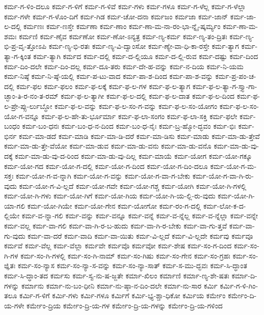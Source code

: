 {ಕರ್ಮ-ಗ-ಳಿಂ-ದಲೂ
ಕರ್ಮ-ಗ-ಳಿಗೆ
ಕರ್ಮ-ಗ-ಳಿವೆ
ಕರ್ಮ-ಗಳು
ಕರ್ಮ-ಗಳೂ
ಕರ್ಮ-ಗ-ಳೆಲ್ಲ
ಕರ್ಮ-ಗ-ಳೆಲ್ಲಾ
ಕರ್ಮ-ಗಳೇ
ಕರ್ಮ-ಗ-ಳೊಂ-ದಿಗೆ
ಕರ್ಮ-ಗಿಡ
ಕರ್ಮ-ಚೋ-ದನಾ
ಕರ್ಮಜಂ
ಕರ್ಮಜಾ
ಕರ್ಮ-ಜಾನ್
ಕರ್ಮ-ಜಾ-ಲ-ದಲ್ಲಿ
ಕರ್ಮಣಃ
ಕರ್ಮ-ಣಸ್ತೇ
ಕರ್ಮಣಾ
ಕರ್ಮ-ಣಾಂ
ಕರ್ಮ-ಣಾ-ಮ-ನಾ-ರಂ-ಭಾ-ನ್ನೈ-ಷ್ಕರ್ಮ್ಯಂ
ಕರ್ಮ-ಣಾ-ಮ-ಶಮಃ
ಕರ್ಮಣಿ
ಕರ್ಮ-ಣೈವ
ಕರ್ಮಣೋ
ಕರ್ಮ-ಣೋ-ಽನ್ಯತ್ರ
ಕರ್ಮ-ಣ್ಯ-ಕರ್ಮ
ಕರ್ಮ-ಣ್ಯ-ತಂ-ದ್ರಿತಃ
ಕರ್ಮ-ಣ್ಯ-ಭಿ-ಪ್ರ-ವೃ-ತ್ತೋಽಪಿ
ಕರ್ಮ-ಣ್ಯ-ಭಿ-ರತಃ
ಕರ್ಮ-ಣ್ಯ-ವಿ-ದ್ವಾಂಸೋ
ಕರ್ಮ-ಣ್ಯೇ-ವಾ-ಧಿ-ಕಾ-ರಸ್ತೇ
ಕರ್ಮ-ತ್ಯಾಗ
ಕರ್ಮ-ತ್ಯಾ-ಗ-ಕ್ಕಿಂತ
ಕರ್ಮ-ತ್ಯಾಗಿ
ಕರ್ಮದ
ಕರ್ಮ-ದಲ್ಲಿ
ಕರ್ಮ-ದ-ಲ್ಲಿಯೂ
ಕರ್ಮ-ದ-ಲ್ಲಿ-ರುವ
ಕರ್ಮ-ದಷ್ಟು
ಕರ್ಮ-ದಿಂದ
ಕರ್ಮ-ದಿಂ-ದಲೇ
ಕರ್ಮ-ದಿಂ-ದಲ್ಲ
ಕರ್ಮ-ದೂ-ತರು
ಕರ್ಮ-ದೇ-ಹ-ವನ್ನು
ಕರ್ಮ-ನ-ದಿಯ
ಕರ್ಮ-ನಿ-ಯಮ
ಕರ್ಮ-ನಿಷ್ಠೆ
ಕರ್ಮ-ನಿ-ಷ್ಠೆ-ಯಲ್ಲಿ
ಕರ್ಮ-ಪ-ಟು-ವಾದ
ಕರ್ಮ-ಪಾ-ಶ-ದಿಂದ
ಕರ್ಮ-ಪಾ-ಶ-ವನ್ನು
ಕರ್ಮ-ಪ್ರ-ಪಂ-ಚ-ದಲ್ಲಿ
ಕರ್ಮ-ಫಲ
ಕರ್ಮ-ಫಲಂ
ಕರ್ಮ-ಫ-ಲಕ್ಕೆ
ಕರ್ಮ-ಫ-ಲ-ಗಳ
ಕರ್ಮ-ಫ-ಲ-ತ್ಯಾಗ
ಕರ್ಮ-ಫ-ಲ-ತ್ಯಾ-ಗ-ಸ್ತ್ಯಾ-ಗಾ-ಚ್ಛಾಂ-ತಿ-ರ-ನಂ-ತ-ರಮ್
ಕರ್ಮ-ಫ-ಲ-ತ್ಯಾಗೀ
ಕರ್ಮ-ಫ-ಲ-ದಲ್ಲಿ
ಕರ್ಮ-ಫ-ಲ-ದಾತ
ಕರ್ಮ-ಫ-ಲ-ದಿಂದ
ಕರ್ಮ-ಫ-ಲ-ಪ್ರೇ-ಪ್ಸು-ರ್ಲುಬ್ಧೋ
ಕರ್ಮ-ಫ-ಲ-ವನ್ನು
ಕರ್ಮ-ಫ-ಲ-ಸಂ-ಗ-ವನ್ನು
ಕರ್ಮ-ಫ-ಲ-ಸಂ-ಯೋಗಂ
ಕರ್ಮ-ಫ-ಲ-ಸಂ-ಯೋ-ಗ-ವನ್ನೂ
ಕರ್ಮ-ಫ-ಲ-ಹೇ-ತು-ರ್ಭೂರ್ಮಾ
ಕರ್ಮ-ಫ-ಲಾ-ಸಂಗಂ
ಕರ್ಮ-ಫ-ಲಾ-ಸಕ್ತಿ
ಕರ್ಮ-ಫಲೇ
ಕರ್ಮ-ಬಂಧಂ
ಕರ್ಮ-ಬಂ-ಧನಃ
ಕರ್ಮ-ಬಂ-ಧ-ನ-ದಿಂದ
ಕರ್ಮ-ಬಂ-ಧ-ನೈಃ
ಕರ್ಮ-ಬ್ರ-ಹ್ಮೋ-ದ್ಭವಂ
ಕರ್ಮ-ಭಿಃ
ಕರ್ಮ-ಭಿರ್ನ
ಕರ್ಮ-ಮಾ-ಡದೆ
ಕರ್ಮ-ಮಾಡಿ
ಕರ್ಮ-ಮಾ-ಡಿ-ದರೆ
ಕರ್ಮ-ಮಾ-ಡಿಸು
ಕರ್ಮ-ಮಾಡು
ಕರ್ಮ-ಮಾ-ಡು-ತ್ತೇವೆ
ಕರ್ಮ-ಮಾ-ಡು-ತ್ತೇ-ವೆಯೋ
ಕರ್ಮ-ಮಾ-ಡುವ
ಕರ್ಮ-ಮಾ-ಡು-ವನು
ಕರ್ಮ-ಮಾ-ಡು-ವನೊ
ಕರ್ಮ-ಮಾ-ಡು-ವು-ದಕ್ಕೆ
ಕರ್ಮ-ಮಾ-ಡು-ವು-ದ-ರಿಂದ
ಕರ್ಮ-ಮಾ-ಡು-ವು-ದಿಲ್ಲ
ಕರ್ಮ-ಮಾಯೆ
ಕರ್ಮ-ಯೋಗ
ಕರ್ಮ-ಯೋ-ಗಕ್ಕೂ
ಕರ್ಮ-ಯೋ-ಗದ
ಕರ್ಮ-ಯೋ-ಗ-ದಲ್ಲಿ
ಕರ್ಮ-ಯೋ-ಗ-ದಿಂದ
ಕರ್ಮ-ಯೋ-ಗ-ದಿಂ-ದಲೂ
ಕರ್ಮ-ಯೋ-ಗ-ಮ-ಸಕ್ತಃ
ಕರ್ಮ-ಯೋ-ಗ-ವ-ನ್ನಾಗಿ
ಕರ್ಮ-ಯೋ-ಗ-ವನ್ನು
ಕರ್ಮ-ಯೋ-ಗ-ವಾ-ಗ-ಬೇಕು
ಕರ್ಮ-ಯೋ-ಗ-ವಾ-ಗಿ-ರು-ವುದು
ಕರ್ಮ-ಯೋ-ಗ-ವಿ-ಲ್ಲದೆ
ಕರ್ಮ-ಯೋ-ಗವೇ
ಕರ್ಮ-ಯೋ-ಗಶ್ಚ
ಕರ್ಮ-ಯೋಗಿ
ಕರ್ಮ-ಯೋ-ಗಿ-ಗಳಲ್ಲಿ
ಕರ್ಮ-ಯೋ-ಗಿ-ಗಳು
ಕರ್ಮ-ಯೋ-ಗಿಗೆ
ಕರ್ಮ-ಯೋ-ಗಿಯ
ಕರ್ಮ-ಯೋ-ಗಿ-ಯ-ಲ್ಲಿ-ರು-ವುದು
ಕರ್ಮ-ಯೋ-ಗಿ-ಯಾ-ಗಲಿ
ಕರ್ಮ-ಯೋ-ಗಿಯೇ
ಕರ್ಮ-ಯೋ-ಗೇನ
ಕರ್ಮ-ಯೋಗೋ
ಕರ್ಮ-ರಂ-ಗ-ದಲ್ಲಿ
ಕರ್ಮ-ಲೋ-ಕ-ದ-ಲ್ಲಿಯೇ
ಕರ್ಮ-ವ-ನ್ನಾ-ಗಲಿ
ಕರ್ಮ-ವನ್ನು
ಕರ್ಮ-ವನ್ನೂ
ಕರ್ಮ-ವನ್ನೆ
ಕರ್ಮ-ವ-ನ್ನೆಲ್ಲ
ಕರ್ಮ-ವ-ನ್ನೆಲ್ಲಾ
ಕರ್ಮ-ವನ್ನೇ
ಕರ್ಮ-ವಲ್ಲ
ಕರ್ಮ-ವಾ-ಗಲಿ
ಕರ್ಮ-ವಾ-ಗಿ-ರ-ಬ-ಹುದು
ಕರ್ಮ-ವಾ-ಗಿ-ರ-ಬೇಕು
ಕರ್ಮ-ವಾ-ಗು-ತ್ತವೆ
ಕರ್ಮ-ವಾ-ಗು-ವುದು
ಕರ್ಮ-ವಾ-ದರೆ
ಕರ್ಮ-ವಾದಿ
ಕರ್ಮ-ವಾ-ಯಿತು
ಕರ್ಮ-ವಿ-ಲ್ಲದೆ
ಕರ್ಮ-ವಿ-ಲ್ಲದೇ
ಕರ್ಮವು
ಕರ್ಮವೂ
ಕರ್ಮವೆ
ಕರ್ಮ-ವೆಲ್ಲ
ಕರ್ಮ-ವೆಲ್ಲಾ
ಕರ್ಮವೇ
ಕರ್ಮವೊ
ಕರ್ಮವೋ
ಕರ್ಮ-ಶೇಷ
ಕರ್ಮ-ಸಂ-ಗ-ದಿಂದ
ಕರ್ಮ-ಸಂ-ಗಿ-ಗಳ
ಕರ್ಮ-ಸಂ-ಗಿ-ಗಳಲ್ಲಿ
ಕರ್ಮ-ಸಂ-ಗಿ-ನಾಮ್
ಕರ್ಮ-ಸಂ-ಗಿಷು
ಕರ್ಮ-ಸಂ-ಗೇನ
ಕರ್ಮ-ಸಂ-ಗ್ರಹಃ
ಕರ್ಮ-ಸಂ-ಜ್ಞಿತಃ
ಕರ್ಮ-ಸಂ-ನ್ಯಾಸ
ಕರ್ಮ-ಸಂ-ನ್ಯಾ-ಸ-ವನ್ನು
ಕರ್ಮ-ಸಂ-ನ್ಯಾ-ಸಾತ್
ಕರ್ಮ-ಸ-ಮು-ದ್ಭವಃ
ಕರ್ಮ-ಸಿ-ದ್ಧಾಂತ
ಕರ್ಮ-ಸಿ-ದ್ಧಾಂ-ತದ
ಕರ್ಮಸು
ಕರ್ಮ-ಸ್ವ-ನು-ಷ-ಜ್ಜತೇ
ಕರ್ಮಾ-ಖಿಲಂ
ಕರ್ಮಾಣಿ
ಕರ್ಮಾ-ಣ್ಯ-ಶೇ-ಷತಃ
ಕರ್ಮಾ-ದಿ-ಗಳನ್ನು
ಕರ್ಮಾನು
ಕರ್ಮಾ-ನು-ಬಂ-ಧೀನಿ
ಕರ್ಮಾ-ನು-ಷ್ಠಾ-ನ-ದಿಂ-ದಲೇ
ಕರ್ಮಾ-ನು-ಸಾರ
ಕರ್ಮಿ
ಕರ್ಮಿ-ಗ-ಳಿ-ಗಿಂ-ತಲೂ
ಕರ್ಮಿ-ಗ-ಳಿಗೆ
ಕರ್ಮಿ-ಗಳು
ಕರ್ಮಿ-ಗಳೂ
ಕರ್ಮಿಗೆ
ಕರ್ಮಿ-ಭ್ಯ-ಶ್ಚಾ-ಧಿಕೋ
ಕರ್ಮಿಯ
ಕರ್ಮೇಂ
ಕರ್ಮೇಂ-ದಿ-ಯ-ಗಳೇ
ಕರ್ಮೇಂ-ದ್ರಿಯ
ಕರ್ಮೇಂ-ದ್ರಿ-ಯ-ಗಳ
ಕರ್ಮೇಂ-ದ್ರಿ-ಯ-ಗಳನ್ನು
ಕರ್ಮೇಂ-ದ್ರಿ-ಯ-ಗಳಿಂದ
}
